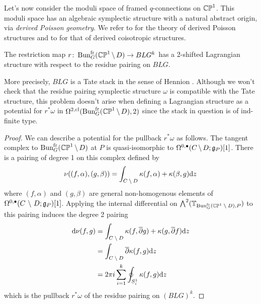 \documentclass[10pt, oneside]{article}
\renewcommand{\d}{\mathrm{d}}
\newcommand{\fr}{\mathrm{fr}}
\begin{document}

Let's now consider the moduli space of framed $q$-connections on $\mathbb{CP}^1$.  This moduli space has an algebraic symplectic structure with a natural abstract origin, via \emph{derived Poisson geometry}.  We refer to \cite{CPTVV} for the theory of derived Poisson structures and to \cite{MelaniSafronov1, MelaniSafronov2, Spaide} for that of derived coisotropic structures.

\begin{lemma} \label{restriction_Lagn_lemma}
The restriction map $r \colon \bun_G^\fr(\bb{CP}^1 \! \bs \! D) \to BLG^k$ has a 2-shifted Lagrangian structure with respect to the residue pairing on $BLG$.
\end{lemma}

\begin{remark}
More precisely, $BLG$ is a Tate stack in the sense of Hennion \cite{Hennion}.  Although we won't check that the residue pairing symplectic structure $\omega$ is compatible with the Tate structure, this problem doesn't arise when defining a Lagrangian structure as a potential for $r^*\omega$ in $\Omega^{2,\mr{cl}}(\bun_G^\fr(\bb{CP}^1 \! \bs \! D), 2)$ since the stack in question is of ind-finite type.
\end{remark}

\begin{proof}
We can describe a potential for the pullback $r^*\omega$ as follows.  The tangent complex to $\bun_G^\fr(\bb{CP}^1 \! \bs \! D)$ at $P$ is quasi-isomorphic to $\Omega^{0,\bullet}(C \!\ \backslash \ \! D; \mathfrak{g}_P)[1]$.  There is a pairing of degree 1 on this complex defined by
\[ \nu((f,\alpha), (g,\beta)) = \int_{C \!\bs\! D} \kappa(f,\alpha) + \kappa(\beta,g) \d z\]
where $(f,\alpha)$ and $(g,\beta)$ are general non-homogenous elements of $\Omega^{0,\bullet}(C \ \backslash \  D; \mathfrak{g}_P)[1]$.  Applying the internal differential on $\bigwedge^2 (\bb T_{\bun_G^\fr(\bb{CP}^1 \! \bs \! D), P})$ to this pairing induces the degree 2 pairing
\begin{align*}
\d \nu(f,g) &= \int_{C \!\bs\! D} \kappa(f, \ol \dd g) + \kappa(g, \ol \dd f) \d z \\
&=\int_{C \!\bs\! D} \ol \dd \kappa(f, g) \d z \\
&=2 \pi i \sum_{i=1}^k \oint_{S^1_i} \kappa(f, g) \d z
\end{align*}
which is the pullback $r^*\omega$ of the residue pairing on $(BLG)^k$.
\end{proof}
\end{document}
